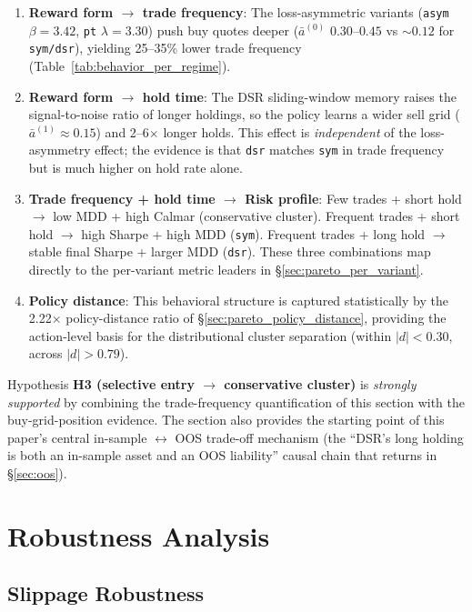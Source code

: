 \documentclass[11pt, a4paper]{article}
\begin{document}
\begin{enumerate}[leftmargin=*]
\item \textbf{Reward form $\to$ trade frequency}: The loss-asymmetric variants
(\texttt{asym} $\beta=3.42$, \texttt{pt} $\lambda=3.30$) push buy quotes
deeper ($\bar{a}^{(0)}$ $0.30$--$0.45$ vs $\sim 0.12$ for \texttt{sym/dsr}),
yielding 25--35\% lower trade frequency (Table~\ref{tab:behavior_per_regime}).
\item \textbf{Reward form $\to$ hold time}: The DSR sliding-window memory
raises the signal-to-noise ratio of longer holdings, so the policy learns a
wider sell grid ($\bar{a}^{(1)} \approx 0.15$) and 2--6$\times$ longer holds.
This effect is \emph{independent} of the loss-asymmetry effect; the evidence
is that \texttt{dsr} matches \texttt{sym} in trade frequency but is much
higher on hold rate alone.
\item \textbf{Trade frequency + hold time $\to$ Risk profile}: Few trades +
short hold $\to$ low MDD + high Calmar (conservative cluster). Frequent
trades + short hold $\to$ high Sharpe + high MDD (\texttt{sym}). Frequent
trades + long hold $\to$ stable final Sharpe + larger MDD (\texttt{dsr}).
These three combinations map directly to the per-variant metric leaders in
\S\ref{sec:pareto_per_variant}.
\item \textbf{Policy distance}: This behavioral structure is captured
statistically by the 2.22$\times$ policy-distance ratio of
\S\ref{sec:pareto_policy_distance}, providing the action-level basis for the
distributional cluster separation (within $|d|<0.30$, across $|d|>0.79$).
\end{enumerate}

Hypothesis \textbf{H3 (selective entry $\to$ conservative cluster)} is
\emph{strongly supported} by combining the trade-frequency quantification of
this section with the buy-grid-position evidence. The section also provides
the starting point of this paper's central in-sample $\leftrightarrow$ OOS
trade-off mechanism (the ``DSR's long holding is both an in-sample asset and
an OOS liability'' causal chain that returns in \S\ref{sec:oos}).

\section{Robustness Analysis}
\label{sec:robustness}

\subsection{Slippage Robustness}
\label{sec:slippage}
\end{document}
